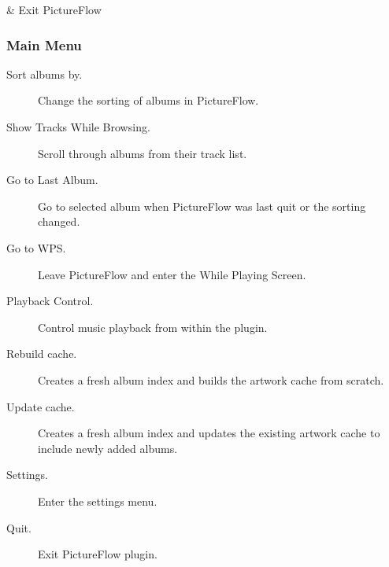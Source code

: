 \begin{btnmap}
            &
        Exit PictureFlow
            \\

    \end{btnmap}

\subsubsection{Main Menu}
\begin{description}
  \item[Sort albums by.] Change the sorting of albums in PictureFlow.
  \item[Show Tracks While Browsing.] Scroll through albums from their track list.
  \item[Go to Last Album.] Go to selected album when PictureFlow was last quit or the sorting changed.
  \item[Go to WPS.] Leave PictureFlow and enter the While Playing Screen.
  \item[Playback Control.] Control music playback from within the plugin.
  \item[Rebuild cache.] Creates a fresh album index and builds the artwork cache from scratch.
  \item[Update cache.] Creates a fresh album index and updates the existing artwork cache to
  include newly added albums.
  \item[Settings.] Enter the settings menu.
  \item[Quit.] Exit PictureFlow plugin.
\end{description}

